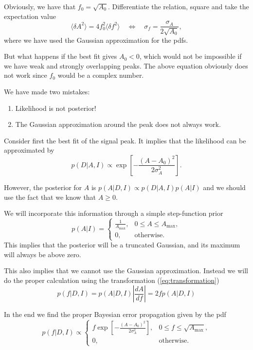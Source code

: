 \documentclass[%
oneside,                 %
final,                   %
10pt]{article}
\begin{document}
\noindent
Obviously, we have that $f_0 = \sqrt{A_0}$. Differentiate the relation, square and take the expectation value
\[
\langle \delta A^2 \rangle = 4 f_0^2 \langle \delta f^2 \rangle \quad 
\Leftrightarrow \quad 
\sigma_f = \frac{\sigma_A}{2 \sqrt{A_0}},
\]
where we have used the Gaussian approximation for the pdfs.

But what happens if the best fit gives $A_0 < 0$, which would not be impossible if we have weak and strongly overlapping peaks. The above equation obviously does not work since $f_0$ would be a complex number.

We have made two mistakes:
\begin{enumerate}
\item Likelihood is not posterior!

\item The Gaussian approximation around the peak does not always work.
\end{enumerate}

\noindent
Consider first the best fit of the signal peak. It implies that the likelihood can be approximated by
\[
p(D | A, I) \propto \exp \left[ -\frac{(A-A_0)^2}{2\sigma_A^2} \right].
\]

However, the posterior for $A$ is $p(A|D,I) \propto p(D|A,I) p(A|I)$ and we should use the fact that we know that $A \ge 0$.

We will incorporate this information through a simple step-function prior
\[
p(A|I) = \left\{
\begin{array}{ll}
\frac{1}{A_\mathrm{max}}, & 0 \le A \le A_\mathrm{max}, \\
0, & \mathrm{otherwise}.
\end{array}
\right.
\]
This implies that the posterior will be a truncated Gaussian, and its maximum will always be above zero.

This also implies that we cannot use the Gaussian approximation. Instead we will do the proper calculation using the transformation (\ref{eq:transformation})
\[
p(f|D,I) = p(A|D,I) \left| \frac{dA}{df} \right| = 2 f p(A|D,I)
\]

In the end we find the proper Bayesian error propagation given by the pdf
\[
p(f|D,I) \propto \left\{
\begin{array}{ll}
f \exp \left[ -\frac{(A-A_0)^2}{2\sigma_A^2} \right], & 0 \le f \le \sqrt{A_\mathrm{max}}, \\
0, & \mathrm{otherwise}.
\end{array}
\right.
\]
\end{document}
